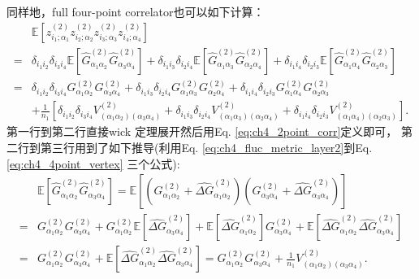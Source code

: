 同样地，full four-point correlator也可以如下计算：
\begin{equation}
    \begin{aligned}
    & \mathbb{E}\left[z_{i_1;\alpha_1}^{(2)}z_{i_2;\alpha_2}^{(2)}
    z_{i_3;\alpha_3}^{(2)}z_{i_4;\alpha_4}^{(2)}\right] \\
    =& \delta_{i_1i_2}\delta_{i_3i_4}\mathbb{E}\left[\hat{G}_{\alpha_1\alpha_2}^{(2)}
    \hat{G}_{\alpha_3\alpha_4}^{(2)}\right] + 
    \delta_{i_1i_3}\delta_{i_2i_4}\mathbb{E}\left[\hat{G}_{\alpha_1\alpha_3}^{(2)}
    \hat{G}_{\alpha_2\alpha_4}^{(2)}\right] +
    \delta_{i_1i_4}\delta_{i_2i_3}\mathbb{E}\left[\hat{G}_{\alpha_1\alpha_4}^{(2)}
    \hat{G}_{\alpha_2\alpha_3}^{(2)}\right]\\
    =& \delta_{i_1i_2}\delta_{i_3i_4}G_{\alpha_1\alpha_2}^{(2)}G_{\alpha_3\alpha_4}^{(2)}+
    \delta_{i_1i_3}\delta_{i_2i_4}G_{\alpha_1\alpha_3}^{(2)}G_{\alpha_2\alpha_4}^{(2)}+
    \delta_{i_1i_4}\delta_{i_2i_3}G_{\alpha_1\alpha_4}^{(2)}G_{\alpha_2\alpha_3}^{(2)} \\
    &+ \frac{1}{n_1}\left[\delta_{i_1i_2}\delta_{i_3i_4}V_{(\alpha_1\alpha_2)(\alpha_3\alpha_4)}^{(2)}
     +\delta_{i_1i_3}\delta_{i_2i_4}V_{(\alpha_1\alpha_3)(\alpha_2\alpha_4)}^{(2)}
     +\delta_{i_1i_4}\delta_{i_2i_3}V_{(\alpha_1\alpha_4)(\alpha_2\alpha_3)}^{(2)}\right].
    \end{aligned}
\end{equation}
第一行到第二行直接wick 定理展开然后用Eq. \ref{eq:ch4_2point_corr}定义即可，
第二行到第三行用到了如下推导(利用Eq. \ref{eq:ch4_fluc_metric_layer2}到Eq. \ref{eq:ch4_4point_vertex} 
三个公式):
\begin{equation*}
    \begin{aligned}
    & \mathbb{E}\left[\hat{G}_{\alpha_1\alpha_2}^{(2)}\hat{G}_{\alpha_3\alpha_4}^{(2)}\right]=
    \mathbb{E}\left[\left(G_{\alpha_1\alpha_2}^{(2)} + \hat{\Delta G}_{\alpha_1\alpha_2}^{(2)} 
    \right)
    \left(G_{\alpha_3\alpha_4}^{(2)} + \hat{\Delta G}_{\alpha_3\alpha_4}^{(2)} \right)\right] \\
    =& G_{\alpha_1\alpha_2}^{(2)}G_{\alpha_3\alpha_4}^{(2)} +
    G_{\alpha_1\alpha_2}^{(2)}\mathbb{E}\left[\hat{\Delta G}_{\alpha_3\alpha_4}^{(2)}\right] +
    \mathbb{E}\left[\hat{\Delta G}_{\alpha_1\alpha_2}^{(2)}\right]G_{\alpha_3\alpha_4}^{(2)} +
    \mathbb{E}\left[\hat{\Delta G}_{\alpha_1\alpha_2}^{(2)}\hat{\Delta G}_{\alpha_3\alpha_4}^{(2)}
    \right] \\
    =& G_{\alpha_1\alpha_2}^{(2)}G_{\alpha_3\alpha_4}^{(2)} + 
    \mathbb{E}\left[\hat{\Delta G}_{\alpha_1\alpha_2}^{(2)}\hat{\Delta G}_{\alpha_3\alpha_4}^{(2)} 
    \right] = G_{\alpha_1\alpha_2}^{(2)}G_{\alpha_3\alpha_4}^{(2)} + \frac{1}{n_1}
    V_{(\alpha_1\alpha_2)(\alpha_3\alpha_4)}^{(2)}.
    \end{aligned}
\end{equation*}
